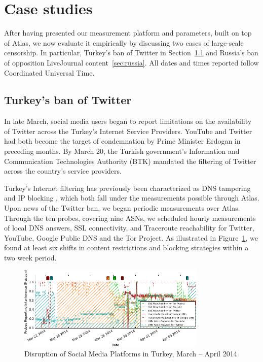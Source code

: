 \section{Case studies}
\label{sec:case_studies}

After having presented our measurement platform and parameters, built on top of
Atlas, we now evaluate it empirically by discussing two cases of large-scale
censorship.  In particular, Turkey's ban of Twitter in
Section~\ref{sec:turkey} and Russia's ban of opposition LiveJournal content~\ref{sec:russia}. All dates and times reported follow Coordinated Universal Time.


\subsection{Turkey's ban of Twitter}
\label{sec:turkey}

In late March, social media users began to report limitations on the
availability of Twitter across the Turkey's Internet Service Providers.
YouTube and Twitter had both become the target of condemnation by Prime Minister
Erdogan in preceding months. By March 20, the Turkish government's Information
and Communication Technologies Authority (BTK) mandated the filtering of
Twitter across the country's service providers.

Turkey's Internet filtering has previously been characterized as DNS tampering and
IP blocking \cite{akdeniz2010report}, which both fall under the measurements
possible through Atlas.  Upon news of the Twitter ban, we began periodic
measurements over Atlas.  Through the ten probes, covering nine ASNs, we
scheduled hourly measurements of local DNS answers, SSL connectivity, and
Traceroute reachability for Twitter, YouTube, Google Public DNS and the Tor
Project.  As illustrated in Figure~\ref{image:tr-social_media_filtering}, we
found at least six shifts in content restrictions and blocking strategies
within a two week period.

\begin{figure}
  \centering
  \includegraphics[width=0.8\textwidth]{resources/tr-20140321-20140407-social_media_filtering.png}
  \caption{Disruption of Social Media Platforms in Turkey, March -- April 2014}
  \label{image:tr-social_media_filtering}
\end{figure}


